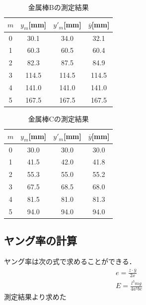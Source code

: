 \documentclass[a4paper,11pt]{ltjsarticle}
\begin{document}
\begin{table}[htbp]
  \centering
  \caption{金属棒Bの測定結果}
  \label{tab:youngs_modulus_B}
  \begin{tabular}{|c|c|c|c|}
    \hline
    $m$ & $y_m$[mm] & $y'_m$[mm] & $\overline{y}$[mm] \\ \hline
    0   & 30.1      & 34.0       & 32.1               \\ \hline
    1   & 60.3      & 60.5       & 60.4               \\ \hline
    2   & 82.3      & 87.5       & 84.9               \\ \hline
    3   & 114.5     & 114.5      & 114.5              \\ \hline
    4   & 141.0     & 141.0      & 141.0              \\ \hline
    5   & 167.5     & 167.5      & 167.5              \\ \hline
  \end{tabular}
\end{table}
\begin{table}[htbp]
  \centering
  \caption{金属棒Cの測定結果}
  \label{tab:youngs_modulus_C}
  \begin{tabular}{|c|c|c|c|}
    \hline
    $m$ & $y_m$[mm] & $y'_m$[mm] & $\overline{y}$[mm] \\ \hline
    0   & 30.0      & 30.0       & 30.0               \\ \hline
    1   & 41.5      & 42.0       & 41.8               \\ \hline
    2   & 55.3      & 55.0       & 55.2               \\ \hline
    3   & 67.5      & 68.5       & 68.0               \\ \hline
    4   & 81.5      & 81.0       & 81.3               \\ \hline
    5   & 94.0      & 94.0       & 94.0               \\ \hline
  \end{tabular}
\end{table}
\newpage
\subsection{ヤング率の計算}
ヤング率は次の式で求めることができる．
\begin{gather}
  e = \frac{z \cdot \overline{y}}{2x} \\
  E = \frac{l^3mg}{4a^3be}
\end{gather}
測定結果より求めた
\end{document}
